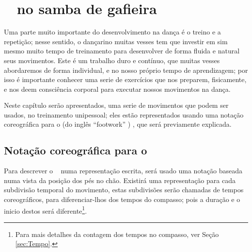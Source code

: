

\chapter{ \Footwork~ no samba de gafieira }

Uma parte muito importante do desenvolvimento na dança é o treino e a repetição;
nesse sentido, o dançarino muitas vesses tem que investir em sim mesmo muito tempo 
de treinamento para desenvolver de forma fluida e natural seus movimentos.
Este é um trabalho duro e contínuo, que muitas vesses abordaremos de forma individual, 
e no nosso próprio tempo de aprendizagem; 
por isso é importante conhecer uma serie de exercícios que nos preparem,
fisicamente, e nos deem consciência corporal para executar nossos movimentos na dança.

Neste capítulo serão apresentados, uma serie de movimentos que podem ser usados,
no treinamento unipessoal; eles estão representados usando uma notação coreográfica
para o \footwork (do inglês ``footwork'' ) , que será previamente explicada.
 
\section{Notação coreográfica para o \footwork }
Para descrever o \footwork~ numa representação escrita, 
será usado uma notação baseada numa vista da posição dos pés no chão. 
Existirá uma representação para cada subdivisão temporal do movimento, 
estas subdivisões serão chamadas de tempos coreográficos, 
para diferenciar-lhos dos tempos do compasso; 
pois a duração e o inicio destos será diferente\footnote{Para 
mais detalhes da contagem dos tempos no compasso, ver Seção \ref{sec:Tempo}.}.

